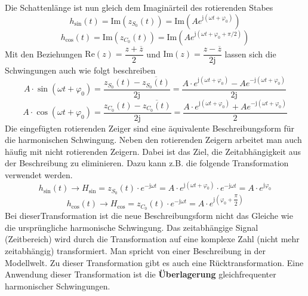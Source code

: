 Die Schattenlänge ist nun gleich dem Imaginärteil des rotierenden Stabes
\begin{equation}
\boxed{h_{\text{sin}}\left(t\right)=\text{Im}\left(z_{S_0}\left(t\right)\right)=\text{Im}\left(Ae^{\text{j}\left(\omega t+\varphi_0\right)}\right)}
\end{equation}
\begin{equation}
\boxed{h_{\text{cos}}\left(t\right)=\text{Im}\left(z_{C_0}\left(t\right)\right)=\text{Im}\left(Ae^{\text{j}\left(\omega t+\varphi_0+\pi/2\right)}\right)}
\end{equation}
Mit den Beziehungen $\text{Re}\left(z\right)=\dfrac{z+\overline{z}}{2}$ und $\text{Im}\left(z\right)=\dfrac{z-\overline{z}}{2\text{j}}$ lassen sich die Schwingungen auch wie folgt beschreiben
\begin{equation}
\boxed{A\cdot \sin\left(\omega t+\varphi_0\right)=\dfrac{z_{S_0}\left(t\right)-\overline{z_{S_0}\left(t\right)}}{2\text{j}}=\dfrac{A\cdot e^{\text{j}\left(\omega t+\varphi_0\right)}-Ae^{-\text{j}\left(\omega t+\varphi_0\right)}}{2\text{j}}}
\end{equation}
\begin{equation}
\boxed{A\cdot \cos\left(\omega t+\varphi_0\right)=\dfrac{z_{C_0}\left(t\right)-\overline{z_{C_0}\left(t\right)}}{2\text{j}}=\dfrac{A\cdot e^{\text{j}\left(\omega t+\varphi_0\right)}+Ae^{-\text{j}\left(\omega t+\varphi_0\right)}}{2}}
\end{equation}
Die eingefügten rotierenden Zeiger sind eine äquivalente Beschreibungsform für die harmonischen Schwingung. Neben den rotierenden Zeigern arbeitet man auch häufig mit nicht rotierenden Zeigern. Dabei ist das Ziel, die Zeitabhängigkeit aus der Beschreibung zu eliminieren. Dazu kann z.B. die folgende Transformation verwendet werden.
\begin{equation}
\boxed{h_{\text{sin}}\left(t\right)\longrightarrow H_{\text{sin}}=z_{S_0}\left(t\right)\cdot e^{-\text{j}\omega t}=A\cdot e^{\text{j}\left(\omega t+\varphi_0\right)}\cdot e^{-\text{j}\omega t}=A\cdot e^{\text{j}\varphi_0}}
\end{equation}
\begin{equation}
\boxed{h_{\text{cos}}\left(t\right)\longrightarrow H_{\text{cos}}=z_{C_0}\left(t\right)\cdot e^{-\text{j}\omega t}=A\cdot e^{\text{j}\left(\varphi_0+\dfrac{\pi}{2}\right)}}
\end{equation}
Bei dieserTransformation ist die neue Beschreibungsform nicht das Gleiche wie die ursprüngliche harmonische Schwingung. Das zeitabhängige Signal (Zeitbereich) wird durch die Transformation auf eine komplexe Zahl (nicht mehr zeitabhängig) transformiert. Man spricht von einer Beschreibung in der Modellwelt. Zu dieser Transformation gibt es auch eine Rücktransformation. Eine Anwendung dieser Transformation ist die \textbf{Überlagerung} gleichfrequenter harmonischer Schwingungen.
